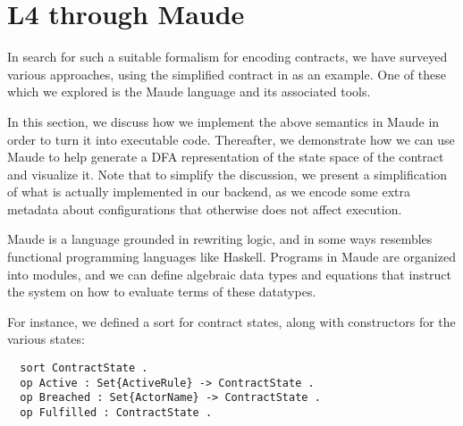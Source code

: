 \documentclass{article}
\begin{document}

\section{L4 through Maude}

In search for such a suitable formalism for encoding contracts,
we have surveyed various approaches, using the simplified contract in
\cite[Fig 1.]{contract_as_automaton} as an example.
One of these which we explored is the Maude language and its associated tools.

In this section, we discuss how we implement the above semantics in Maude in
order to turn it into executable code.
Thereafter, we demonstrate how we can use Maude to help generate a DFA
representation of the state space of the contract and visualize it.
Note that to simplify the discussion, we present a simplification of what is
actually implemented in our backend, as we encode some extra metadata about
configurations that otherwise does not affect execution.


Maude is a language grounded in rewriting logic, and in some ways resembles
functional programming languages like Haskell.
Programs in Maude are organized into modules, and we can define algebraic data
types and equations that instruct the system on how to evaluate terms of these
datatypes.

For instance, we defined a sort for contract states, along with constructors
for the various states:
\begin{lstlisting}
  sort ContractState .
  op Active : Set{ActiveRule} -> ContractState .
  op Breached : Set{ActorName} -> ContractState .
  op Fulfilled : ContractState .
\end{lstlisting}
\end{document}
